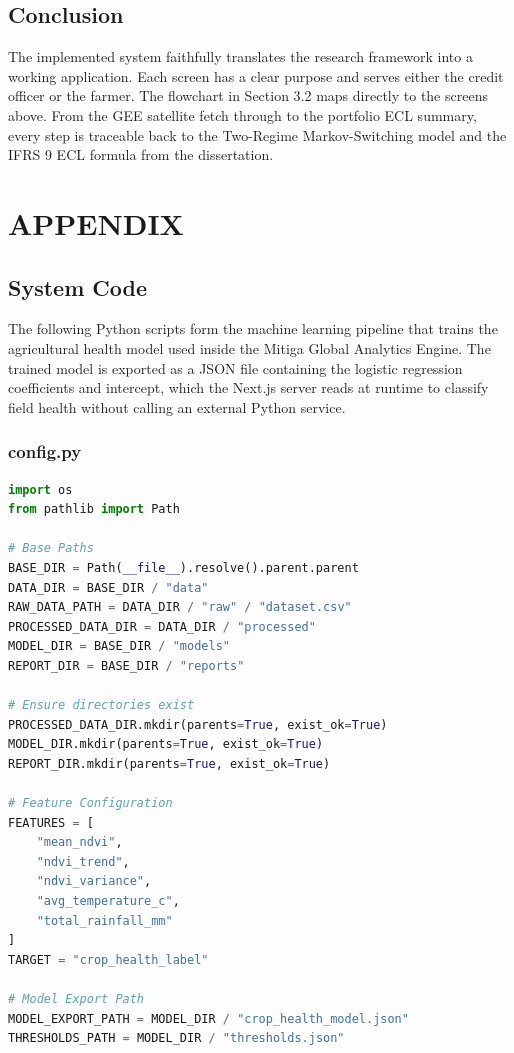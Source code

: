 \documentclass[12pt,a4paper]{article}
\begin{document}
\subsection*{Conclusion}

The implemented system faithfully translates the research framework into a working application. Each screen has a clear purpose and serves either the credit officer or the farmer. The flowchart in Section 3.2 maps directly to the screens above. From the GEE satellite fetch through to the portfolio ECL summary, every step is traceable back to the Two-Regime Markov-Switching model and the IFRS 9 ECL formula from the dissertation.

\newpage

{}

\section*{APPENDIX}

\subsection*{System Code}

The following Python scripts form the machine learning pipeline that trains the agricultural health model used inside the Mitiga Global Analytics Engine. The trained model is exported as a JSON file containing the logistic regression coefficients and intercept, which the Next.js server reads at runtime to classify field health without calling an external Python service.

\subsubsection*{config.py}

\begin{lstlisting}[language=Python, caption={config.py --- Project paths and feature configuration}]
import os
from pathlib import Path

# Base Paths
BASE_DIR = Path(__file__).resolve().parent.parent
DATA_DIR = BASE_DIR / "data"
RAW_DATA_PATH = DATA_DIR / "raw" / "dataset.csv"
PROCESSED_DATA_DIR = DATA_DIR / "processed"
MODEL_DIR = BASE_DIR / "models"
REPORT_DIR = BASE_DIR / "reports"

# Ensure directories exist
PROCESSED_DATA_DIR.mkdir(parents=True, exist_ok=True)
MODEL_DIR.mkdir(parents=True, exist_ok=True)
REPORT_DIR.mkdir(parents=True, exist_ok=True)

# Feature Configuration
FEATURES = [
    "mean_ndvi",
    "ndvi_trend",
    "ndvi_variance",
    "avg_temperature_c",
    "total_rainfall_mm"
]
TARGET = "crop_health_label"

# Model Export Path
MODEL_EXPORT_PATH = MODEL_DIR / "crop_health_model.json"
THRESHOLDS_PATH = MODEL_DIR / "thresholds.json"
\end{lstlisting}
\end{document}
